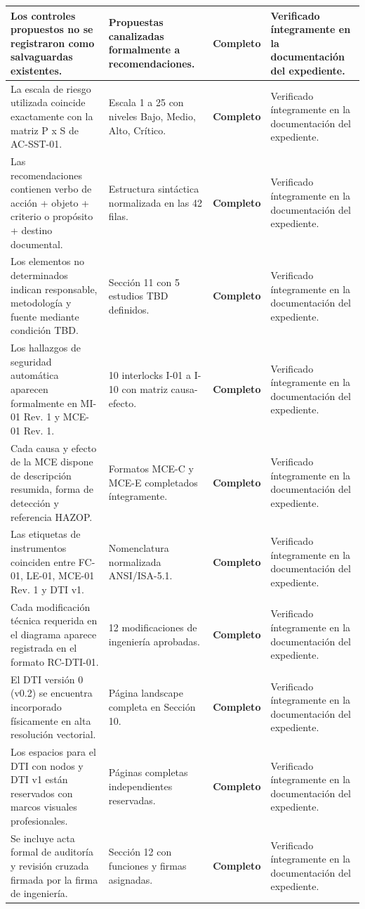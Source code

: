 \documentclass[10pt,letterpaper]{article}
\begin{document}
\begin{table}[H]
\begin{tabularx}{\textwidth}{|p{5.5cm}|p{2.8cm}|c|X|}
Los controles propuestos no se registraron como salvaguardas existentes. & Propuestas canalizadas formalmente a recomendaciones. & \textbf{Completo} & Verificado íntegramente en la documentación del expediente. \\ \hline
La escala de riesgo utilizada coincide exactamente con la matriz P x S de AC-SST-01. & Escala 1 a 25 con niveles Bajo, Medio, Alto, Crítico. & \textbf{Completo} & Verificado íntegramente en la documentación del expediente. \\ \hline
Las recomendaciones contienen verbo de acción + objeto + criterio o propósito + destino documental. & Estructura sintáctica normalizada en las 42 filas. & \textbf{Completo} & Verificado íntegramente en la documentación del expediente. \\ \hline
Los elementos no determinados indican responsable, metodología y fuente mediante condición TBD. & Sección 11 con 5 estudios TBD definidos. & \textbf{Completo} & Verificado íntegramente en la documentación del expediente. \\ \hline
Los hallazgos de seguridad automática aparecen formalmente en MI-01 Rev. 1 y MCE-01 Rev. 1. & 10 interlocks I-01 a I-10 con matriz causa-efecto. & \textbf{Completo} & Verificado íntegramente en la documentación del expediente. \\ \hline
Cada causa y efecto de la MCE dispone de descripción resumida, forma de detección y referencia HAZOP. & Formatos MCE-C y MCE-E completados íntegramente. & \textbf{Completo} & Verificado íntegramente en la documentación del expediente. \\ \hline
Las etiquetas de instrumentos coinciden entre FC-01, LE-01, MCE-01 Rev. 1 y DTI v1. & Nomenclatura normalizada ANSI/ISA-5.1. & \textbf{Completo} & Verificado íntegramente en la documentación del expediente. \\ \hline
Cada modificación técnica requerida en el diagrama aparece registrada en el formato RC-DTI-01. & 12 modificaciones de ingeniería aprobadas. & \textbf{Completo} & Verificado íntegramente en la documentación del expediente. \\ \hline
El DTI versión 0 (v0.2) se encuentra incorporado físicamente en alta resolución vectorial. & Página landscape completa en Sección 10. & \textbf{Completo} & Verificado íntegramente en la documentación del expediente. \\ \hline
Los espacios para el DTI con nodos y DTI v1 están reservados con marcos visuales profesionales. & Páginas completas independientes reservadas. & \textbf{Completo} & Verificado íntegramente en la documentación del expediente. \\ \hline
Se incluye acta formal de auditoría y revisión cruzada firmada por la firma de ingeniería. & Sección 12 con funciones y firmas asignadas. & \textbf{Completo} & Verificado íntegramente en la documentación del expediente. \\ \hline
\end{tabularx}
\end{table}
\end{document}
